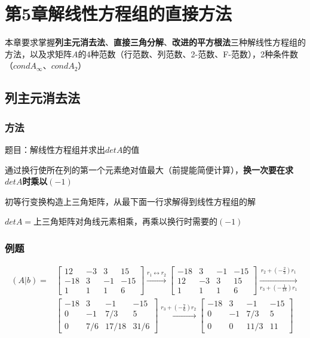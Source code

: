 \section{第5章解线性方程组的直接方法}

本章要求掌握\textbf{列主元消去法}、\textbf{直接三角分解}、\textbf{改进的平方根法}三种解线性方程组的方法，以及求矩阵$A$的4种范数（行范数、列范数、2-范数、F-范数），2种条件数（$condA_\infty$、$condA_2$）

\subsection{列主元消去法}

\subsubsection{方法}

题目：解线性方程组并求出$detA$的值

通过换行使所在列的第一个元素绝对值最大（前提能简便计算），\textbf{换一次要在求$detA$时乘以$(-1)$}

初等行变换构造上三角矩阵，从最下面一行求解得到线性方程组的解

$detA=$上三角矩阵对角线元素相乘，再乘以换行时需要的$(-1)$

\subsubsection{例题}

\[
\begin{aligned}
(A|b) = &
\left[
\begin{array}{ccc|c}
12 & -3 & 3 & 15 \\
-18 & 3 & -1 & -15 \\
1 & 1 & 1 & 6
\end{array}
\right] 
\xrightarrow{r_1 \leftrightarrow r_2} 
\left[
\begin{array}{ccc|c}
-18 & 3 & -1 & -15 \\
12 & -3 & 3 & 15 \\
1 & 1 & 1 & 6
\end{array}
\right]
\underset{r_3 + \left( -\frac{1}{18} \right) r_1}{\overset{r_2 + \left( -\frac{2}{3} \right) r_1}{\xrightarrow{\hspace{2cm}}}} \\
&\left[
\begin{array}{ccc|c}
-18 & 3 & -1 & -15 \\
0 & -1 & 7/3 & 5 \\
0 & 7/6 & 17/18 & 31/6
\end{array}
\right]
\xrightarrow{r_3 + \left( -\frac{7}{6} \right) r_2} 
\left[
\begin{array}{ccc|c}
-18 & 3 & -1 & -15 \\
0 & -1 & 7/3 & 5 \\
0 & 0 & 11/3 & 11
\end{array}
\right]
\end{aligned}
\]

